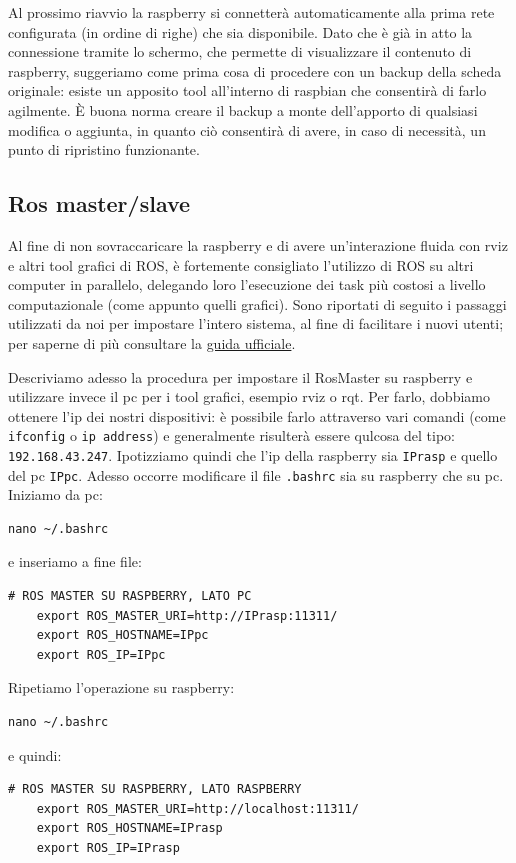 Al prossimo riavvio la raspberry si connetterà automaticamente alla prima rete configurata (in ordine di righe) che sia disponibile. 
Dato che è già in atto la connessione tramite lo schermo, che permette di visualizzare il contenuto di raspberry, suggeriamo come prima cosa di procedere 
con un backup della scheda originale: esiste un apposito tool all'interno di raspbian che consentirà di farlo agilmente. \`E buona norma creare il backup a 
monte dell'apporto di qualsiasi modifica o aggiunta, in quanto ciò consentirà di avere, in caso di necessità, un punto di ripristino funzionante. 

\subsection{Ros master/slave}
\label{sez: Ros master/slave}
Al fine di non sovraccaricare la raspberry e di avere un'interazione fluida con rviz e altri tool grafici di ROS, è fortemente consigliato l'utilizzo di ROS su 
altri computer in parallelo, delegando loro l'esecuzione dei task più costosi a livello computazionale (come appunto quelli grafici). 
Sono riportati di seguito i passaggi utilizzati da noi per impostare l'intero sistema, al fine di facilitare i nuovi utenti; per saperne di più consultare la 
\href{https://wiki.ros.org/ROS/Tutorials/MultipleMachines}{guida ufficiale}. 

Descriviamo adesso la procedura per impostare il RosMaster su raspberry e utilizzare invece il pc per i tool grafici, esempio rviz o rqt. 
Per farlo, dobbiamo ottenere l'ip dei nostri dispositivi: è possibile farlo attraverso vari comandi (come \texttt{ifconfig} o \texttt{ip address}) e generalmente 
risulterà essere qulcosa del tipo: \verb|192.168.43.247|. 
Ipotizziamo quindi che l'ip della raspberry sia \texttt{IPrasp} e quello del pc \texttt{IPpc}. 
Adesso occorre modificare il file \texttt{.bashrc} sia su raspberry che su pc. Iniziamo da pc:
\begin{lstlisting}[style=bashpc]
	nano ~/.bashrc 
\end{lstlisting}
e inseriamo a fine file:
\begin{lstlisting}[style=xml]
	# ROS MASTER SU RASPBERRY, LATO PC
	export ROS_MASTER_URI=http://IPrasp:11311/
	export ROS_HOSTNAME=IPpc
	export ROS_IP=IPpc
\end{lstlisting}

Ripetiamo l'operazione su raspberry:
\begin{lstlisting}[style=bash]
	nano ~/.bashrc 
\end{lstlisting}
e quindi:
\begin{lstlisting}[style=xml]
	# ROS MASTER SU RASPBERRY, LATO RASPBERRY
    export ROS_MASTER_URI=http://localhost:11311/
	export ROS_HOSTNAME=IPrasp
	export ROS_IP=IPrasp
\end{lstlisting}

